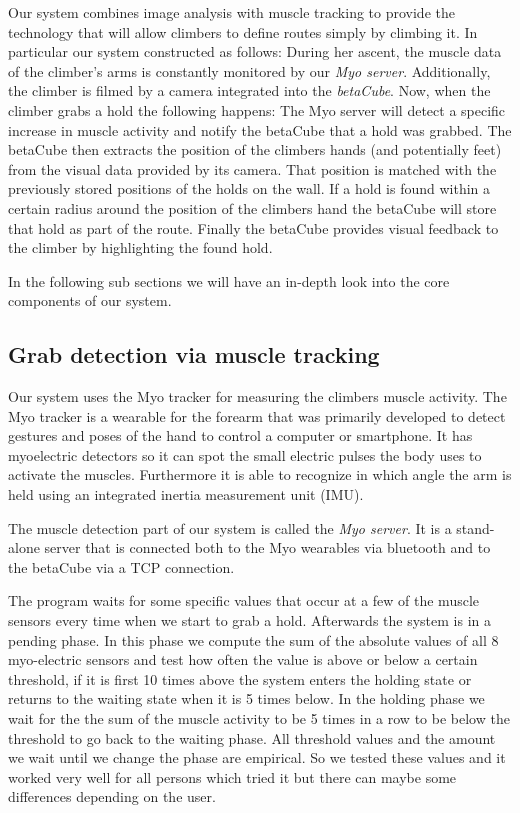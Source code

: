 Our system combines image analysis with muscle tracking to provide the technology that will allow climbers to define routes simply by climbing it.
In particular our system constructed as follows:
During her ascent, the muscle data of the climber's arms is constantly monitored by our \emph{Myo server}.
Additionally, the climber is filmed by a camera integrated into the \emph{betaCube}.
Now, when the climber grabs a hold the following happens:
The Myo server will detect a specific increase in muscle activity and notify the betaCube that a hold was grabbed.
The betaCube then extracts the position of the climbers hands (and potentially feet) from the visual data provided by its camera.
That position is matched with the previously stored positions of the holds on the wall.
If a hold is found within a certain radius around the position of the climbers hand the betaCube will store that hold as part of the route.
Finally the betaCube provides visual feedback to the climber by highlighting the found hold.

In the following sub sections we will have an in-depth look into the core components of our system.

\subsection{Grab detection via muscle tracking}
Our system uses the Myo tracker for measuring the climbers muscle activity.
The Myo tracker is a wearable for the forearm that was primarily developed to detect gestures and poses of the hand to control a computer or smartphone.
It has myoelectric detectors so it can spot the small electric pulses the body uses to activate the muscles.
Furthermore it is able to recognize in which angle the arm is held using an integrated inertia measurement unit (IMU).

The muscle detection part of our system is called the \emph{Myo server}.
It is a stand-alone server that is connected both to the Myo wearables via bluetooth and to the betaCube via a TCP connection.

The program waits for some specific values that occur at a few of the muscle sensors every time when we start to grab a hold.
Afterwards the system is in a pending phase.
In this phase we compute the sum of the absolute values of all 8 myo-electric sensors and test how often the value is above or below a certain threshold, if it is first 10 times above the system enters the holding state or returns to the waiting state when it is 5 times below.
In the holding phase we wait for the the sum of the muscle activity to be 5 times in a row to be below the threshold to go back to the waiting phase.
All threshold values and the amount we wait until we change the phase are empirical.
So we tested these values and it worked very well for all persons which tried it but there can maybe some differences depending on the user.


